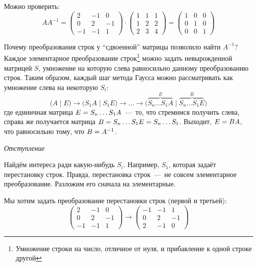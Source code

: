 \documentclass[a4paper,12pt]{article}
\begin{document}
\begin{solution}
    Можно проверить:
    \[
      AA^{-1} = \begin{pmatrix}
        2 & -1 & 0\\
        0 & 2 & -1\\
        -1 & -1 & 1
      \end{pmatrix}
      \cdot \begin{pmatrix}
        1 & 1 & 1\\
        1 & 2 & 2\\
        2 & 3 & 4
      \end{pmatrix}
      = \begin{pmatrix}
        1 & 0 & 0\\
        0 & 1 & 0\\
        0 & 0 & 1
      \end{pmatrix}
    \]
    
    Почему преобразования строк у ``сдвоенной'' матрицы позволило найти $A^{-1}$?
    Каждое элементарное преобразование строк\footnote{Умножение строки на число, отличное от нуля, и прибавление к одной строке другой} можно задать невырожденной матрицей $S$, умножение на которую слева равносильно данному преобразованию строк.
    Таким образом, каждый шаг метода Гаусса можно рассматривать как умножение слева на некоторую $S_i$:
    \[
      \bigl(A \mid E\bigr) \to \bigl(S_1 A \mid S_1 E\bigr) \to \ldots
      \to \bigl(\overbrace{S_n \ldots S_1 A}^{E} \mid \overbrace{S_n \ldots S_1 E}^{B}\bigr)
    \]
    где единичная матрица $E \hm= S_n \ldots S_1 A$~---~то, что стремимся получить слева, справа же получается матрица $B \hm= S_n \ldots S_1 E \hm= S_n \ldots S_1$.
    Выходит, $E \hm= BA$, что равносильно тому, что $B \hm= A^{-1}$.
    
    \bigskip
    
    \emph{Отступление}
    
    Найдём интереса ради какую-нибудь $S_i$.
    Например, $S_1$, которая задаёт перестановку строк.
    Правда, перестановка строк~---~не совсем элементарное преобразование.
    Разложим его сначала на элементарные.
    
    Мы хотим задать преобразование перестановки строк (первой и третьей):
    \[
      \begin{pmatrix}
        2 & -1 & 0\\
        0 & 2 & -1\\
        -1 & -1 & 1
      \end{pmatrix}
      \longrightarrow \begin{pmatrix}
        -1 & -1 & 1\\
        0 & 2 & -1\\
        2 & -1 & 0
      \end{pmatrix}
    \]
    

\end{solution}
\end{document}
